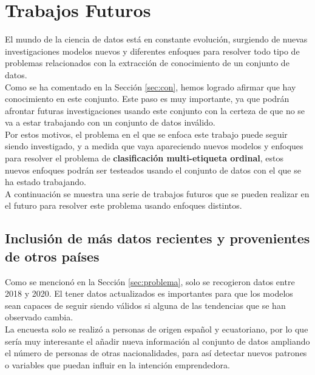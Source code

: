 \chapter{Trabajos Futuros}
El mundo de la ciencia de datos está en constante evolución, surgiendo de nuevas investigaciones modelos nuevos y diferentes enfoques para resolver todo tipo de problemas relacionados con la extracción de conocimiento de un conjunto de datos.\\
\linebreak
Como se ha comentado en la Sección \ref{sec:con}, hemos logrado afirmar que hay conocimiento en este conjunto. Este paso es muy importante, ya que podrán afrontar futuras investigaciones usando este conjunto con la certeza de que no se va a estar trabajando con un conjunto de datos inválido.\\
\linebreak
Por estos motivos, el problema en el que se enfoca este trabajo puede seguir siendo investigado, y a medida que vaya apareciendo nuevos modelos y enfoques para resolver el problema de\textbf{ clasificación multi-etiqueta ordinal}, estos nuevos enfoques podrán ser testeados usando el conjunto de datos con el que se ha estado trabajando.\\
\linebreak
A continuación se muestra una serie de trabajos futuros que se pueden realizar en el futuro para resolver este problema usando enfoques distintos.
\section*{Inclusión de más datos recientes y provenientes de otros países} 
Como se mencionó en la Sección \ref{sec:problema}, solo se recogieron datos entre 2018 y 2020. El tener datos actualizados es importantes para que los modelos sean capaces de seguir siendo válidos si alguna de las tendencias que se han observado cambia.\\
\linebreak
La encuesta solo se realizó a personas de origen español y ecuatoriano, por lo que sería muy interesante el añadir nueva información al conjunto de datos ampliando el número de personas de otras nacionalidades, para así detectar nuevos patrones o variables que puedan influir en la intención emprendedora.

